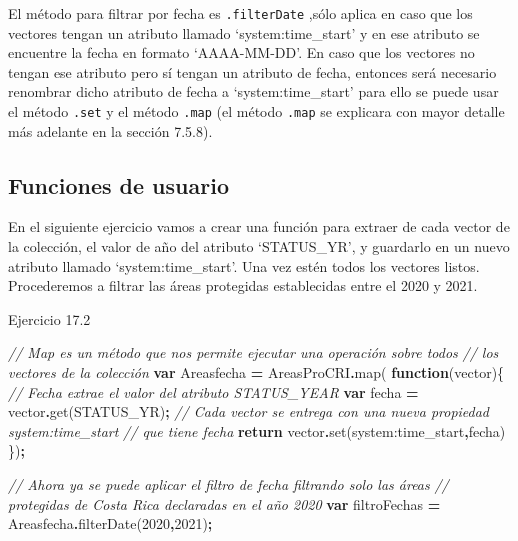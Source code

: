 \documentclass[
  12pt,
  letterpaper,
  twoside]{book}
\newenvironment{Shaded}{\begin{snugshade}}{\end{snugshade}}
\newcommand{\CommentTok}[1]{\textcolor[rgb]{0.56,0.35,0.01}{\textit{#1}}}
\newcommand{\ControlFlowTok}[1]{\textcolor[rgb]{0.13,0.29,0.53}{\textbf{#1}}}
\newcommand{\DecValTok}[1]{\textcolor[rgb]{0.00,0.00,0.81}{#1}}
\newcommand{\FunctionTok}[1]{\textcolor[rgb]{0.00,0.00,0.00}{#1}}
\newcommand{\KeywordTok}[1]{\textcolor[rgb]{0.13,0.29,0.53}{\textbf{#1}}}
\newcommand{\NormalTok}[1]{#1}
\newcommand{\OperatorTok}[1]{\textcolor[rgb]{0.81,0.36,0.00}{\textbf{#1}}}
\newcommand{\StringTok}[1]{\textcolor[rgb]{0.31,0.60,0.02}{#1}}
\begin{document}
El método para filtrar por fecha es \texttt{.filterDate} ,sólo aplica en caso que los vectores tengan un atributo llamado `system:time\_start' y en ese atributo se encuentre la fecha en formato `AAAA-MM-DD'. En caso que los vectores no tengan ese atributo pero sí tengan un atributo de fecha, entonces será necesario renombrar dicho atributo de fecha a `system:time\_start' para ello se puede usar el método \texttt{.set} y el método \texttt{.map} (el método \texttt{.map} se explicara con mayor detalle más adelante en la sección 7.5.8).

\hypertarget{funciones-de-usuario}{%
\subsection*{Funciones de usuario}\label{funciones-de-usuario}}

En el siguiente ejercicio vamos a crear una función para extraer de cada vector de la colección, el valor de año del atributo `STATUS\_YR', y guardarlo en un nuevo atributo llamado `system:time\_start'. Una vez estén todos los vectores listos. Procederemos a filtrar las áreas protegidas establecidas entre el 2020 y 2021.

Ejercicio 17.2

\begin{Shaded}
\begin{Highlighting}[]
\CommentTok{// Map es un método que nos permite ejecutar una operación sobre todos }
\CommentTok{// los vectores de la colección}
\KeywordTok{var}\NormalTok{ Areasfecha }\OperatorTok{=}\NormalTok{ AreasProCRI}\OperatorTok{.}\FunctionTok{map}\NormalTok{( }\KeywordTok{function}\NormalTok{(vector)\{ }
  \CommentTok{// Fecha extrae el valor del atributo \textquotesingle{}STATUS\_YEAR\textquotesingle{}}
  \KeywordTok{var}\NormalTok{ fecha }\OperatorTok{=}\NormalTok{ vector}\OperatorTok{.}\FunctionTok{get}\NormalTok{(}\StringTok{\textquotesingle{}STATUS\_YR\textquotesingle{}}\NormalTok{)}\OperatorTok{;}   
  \CommentTok{// Cada vector se entrega con una nueva propiedad \textquotesingle{}system:time\_start\textquotesingle{} }
  \CommentTok{// que tiene fecha}
  \ControlFlowTok{return}\NormalTok{ vector}\OperatorTok{.}\FunctionTok{set}\NormalTok{(}\StringTok{\textquotesingle{}system:time\_start\textquotesingle{}}\OperatorTok{,}\NormalTok{fecha)}
\NormalTok{\})}\OperatorTok{;} 

\CommentTok{// Ahora ya se puede aplicar el filtro de fecha filtrando solo las áreas }
\CommentTok{// protegidas de Costa Rica declaradas en el año 2020}
\KeywordTok{var}\NormalTok{ filtroFechas }\OperatorTok{=}\NormalTok{ Areasfecha}\OperatorTok{.}\FunctionTok{filterDate}\NormalTok{(}\DecValTok{2020}\OperatorTok{,}\DecValTok{2021}\NormalTok{)}\OperatorTok{;} 
\end{Highlighting}
\end{Shaded}
\end{document}

